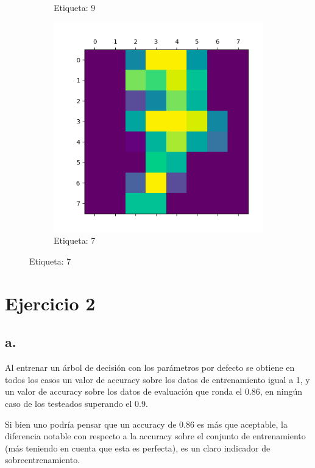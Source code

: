 \documentclass{article}
\begin{document}
\begin{figure}[H]
\begin{subfigure}[b]{0.3\textwidth}
		\caption{Etiqueta: 9}
	\end{subfigure}
	\begin{subfigure}[b]{0.3\textwidth}
		\centering
		\includegraphics*[scale=0.2]{Images/muestra7.png}
		\caption{Etiqueta: 7}
	\end{subfigure}
\end{figure}

\section*{Ejercicio 2}

\subsection*{a.}

Al entrenar un árbol de decisión con los parámetros por defecto se obtiene en todos los casos un valor de accuracy sobre los datos de entrenamiento igual a 1, y un valor de accuracy sobre los datos de evaluación que ronda el 0.86, en ningún caso de los testeados superando el 0.9.

Si bien uno podría pensar que un accuracy de 0.86 es más que aceptable, la diferencia notable con respecto a la accuracy sobre el conjunto de entrenamiento (más teniendo en cuenta que esta es perfecta), es un claro indicador de sobreentrenamiento.
\end{document}

